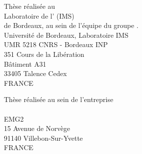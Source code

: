 \thispagestyle{empty}

\vspace*{\fill}

\begin{center}
	Thèse réalisée au  \\
	\vspace*{2em}
	Laboratoire de l' (IMS)\\
	de Bordeaux, au sein de l'équipe  du groupe .\\
	\vspace*{1em}
	Université de Bordeaux, Laboratoire IMS\\
	UMR 5218 CNRS - Bordeaux INP\\
	351 Cours de la Libération\\
	Bâtiment A31\\
	33405 Talence Cedex\\
	FRANCE\\
	\vspace*{2em}

	Thèse réalisée au sein de l'entreprise\\
	\vspace*{2em}
	\\
	\vspace*{1em}
	EMG2\\
	15 Avenue de Norvège\\
	91140 Villebon-Sur-Yvette\\
	FRANCE\\
	\vspace*{2em}

\end{center}